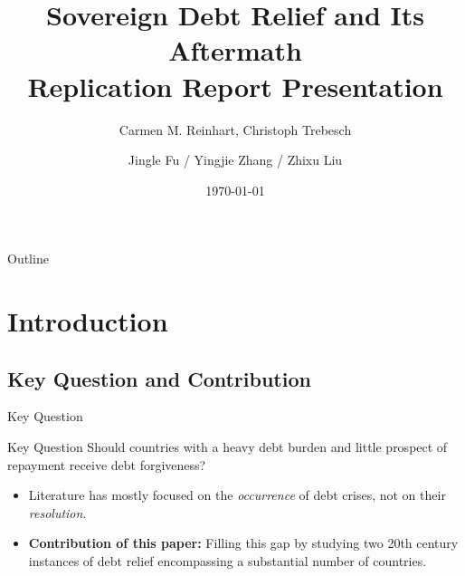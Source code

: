 \documentclass{beamer}
\title{Sovereign Debt Relief and Its Aftermath \\ Replication Report Presentation}
\subtitle{Carmen M. Reinhart, Christoph Trebesch}
\author{Jingle Fu / Yingjie Zhang / Zhixu Liu}
\date{\today}
\begin{document}
\begin{frame}
  \titlepage
\end{frame}

\begin{frame}{Outline}
  \tableofcontents
\end{frame}

\section{Introduction}

\subsection{Key Question and Contribution}
\begin{frame}{Key Question}
  \begin{block}{Key Question}
    Should countries with a heavy debt burden and little prospect of repayment receive debt forgiveness?
  \end{block}
  \begin{itemize}
    \item Literature has mostly focused on the \textit{occurrence} of debt crises, not on their \textit{resolution}.
    \item \textbf{Contribution of this paper:} Filling this gap by studying two 20th century instances of debt relief encompassing a substantial number of countries.
  \end{itemize}
\end{frame}
\end{document}
